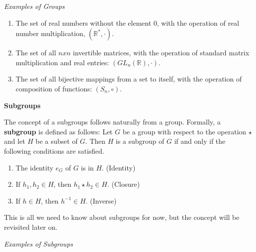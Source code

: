 \documentclass[12pt, a4paper]{article}
\begin{document}
\begin{flushleft}

    \large{\textit{Examples of Groups}}

\end{flushleft}

\begin{enumerate}

    \item The set of real numbers without the element 0, with the operation of real number multiplication, $(\mathbb{R}^{\ast}, \cdot)$.
    
    \item The set of all $nxn$ invertible matrices, with the operation of standard matrix multiplication and real entries: $(GL_n(\mathbb{R}), \cdot)$.
    
    \item The set of all bijective mappings from a set to itself, with the operation of composition of functions: $(S_n, \circ)$.
    
\end{enumerate}

\newpage

\begin{flushleft}
    \textbf{\large{Subgroups}}\normalsize
\end{flushleft}



    The concept of a subgroups follows naturally from a group. Formally, a \textbf{subgroup} is defined as follows: Let $G$ be a group with respect to the operation $\star$ and let $H$ be a subset of $G$. Then $H$ is a subgroup of $G$ if and only if the following conditions are satisfied.\par
    
\begin{enumerate}

    \item The identity $e_G$ of $G$ is in $H$. (Identity)
    
    \item If $h_1,h_2\in H$, then $h_1\star h_2\in H$. (Closure) 
    
    \item If $h\in H$, then $h^{-1}\in H$. (Inverse)
    
\end{enumerate}

    This is all we need to know about subgroups for now, but the concept will be revisited later on.
    

\begin{flushleft}

    \large{\textit{Examples of Subgroups}}

\end{flushleft}
\end{document}
